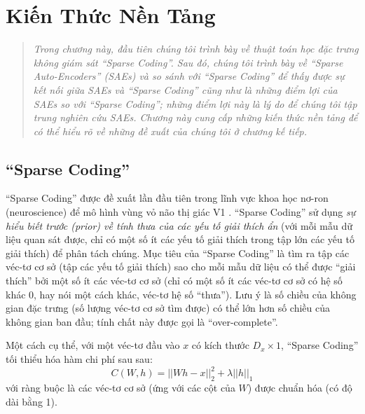 \chapter{Kiến Thức Nền Tảng}
\ifpdf
    \graphicspath{{Chapter2/Chapter2Figs/PNG/}{Chapter2/Chapter2Figs/PDF/}{Chapter2/Chapter2Figs/}}
\else
    \graphicspath{{Chapter2/Chapter2Figs/EPS/}{Chapter2/Chapter2Figs/}}
\fi

\begin{quote}
\textit{Trong chương này, đầu tiên chúng tôi trình bày về thuật toán học đặc trưng không giám sát ``Sparse Coding''. Sau đó, chúng tôi trình bày về ``Sparse Auto-Encoders'' (SAEs) và so sánh với ``Sparse Coding'' để thấy được sự kết nối giữa SAEs và ``Sparse Coding'' cũng như là những điểm lợi của SAEs so với ``Sparse Coding''; những điểm lợi này là lý do để chúng tôi tập trung nghiên cứu SAEs. Chương này cung cấp những kiến thức nền tảng để có thể hiểu rõ về những đề xuất của chúng tôi ở chương kế tiếp.}
\end{quote}
\section{``Sparse Coding''}
``Sparse Coding'' được đề xuất lần đầu tiên trong lĩnh vực khoa học nơ-ron (neuroscience) để mô hình vùng vỏ não thị giác V1 \cite{olshausen1996emergence}. ``Sparse Coding'' sử dụng \emph{sự hiểu biết trước (prior) về tính thưa của các yếu tố giải thích ẩn} (với mỗi mẫu dữ liệu quan sát được, chỉ có một số ít các yếu tố giải thích trong tập lớn các yếu tố giải thích) để phân tách chúng. Mục tiêu của ``Sparse Coding'' là tìm ra tập các véc-tơ cơ sở (tập các yếu tố giải thích) sao cho mỗi mẫu dữ liệu có thể được ``giải thích'' bởi một số ít các véc-tơ cơ sở (chỉ có một số ít các véc-tơ cơ sở có hệ số khác 0, hay nói một cách khác, véc-tơ hệ số ``thưa''). Lưu ý là số chiều của không gian đặc trưng (số lượng véc-tơ cơ sở tìm được) có thể lớn hơn số chiều của không gian ban đầu; tính chất này được gọi là ``over-complete''.

Một cách cụ thể, với một véc-tơ đầu vào $x$ có kích thước $D_x \times 1$, ``Sparse Coding'' tối thiểu hóa hàm chi phí sau sau:
\begin{equation} \label{eq_SparseCoding}
	C(W, h) = ||Wh - x||_2^2 + \lambda||h||_1
\end{equation}
với ràng buộc là các véc-tơ cơ sở (ứng với các cột của $W$) được chuẩn hóa (có độ dài bằng 1).


